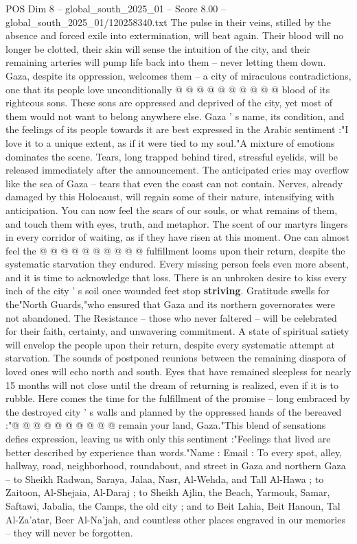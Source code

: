 \begin{textsample}{POS Dim 8 – global\_south\_2025\_01 – Score 8.00 – global\_south\_2025\_01/120258340.txt}
The pulse in their veins, stilled by the absence and forced exile into extermination, will beat again.
Their blood will no longer be clotted, their skin will sense the intuition of the city, and their remaining arteries will pump life back into them -- never letting them down.
Gaza, despite its oppression, welcomes them -- a city of miraculous contradictions, one that its people love unconditionally @ @ @ @ @ @ @ @ @ @ blood of its righteous sons.
These sons are oppressed and deprived of the city, yet most of them would not want to belong anywhere else.
Gaza ' s name, its condition, and the feelings of its people towards it are best expressed in the Arabic sentiment :"I love it to a unique extent, as if it were tied to my soul."A mixture of emotions dominates the scene.
Tears, long trapped behind tired, stressful eyelids, will be released immediately after the announcement.
The anticipated cries may overflow like the sea of Gaza -- tears that even the coast can not contain.
Nerves, already damaged by this Holocaust, will regain some of their nature, intensifying with anticipation.
You can now feel the scars of our souls, or what remains of them, and touch them with eyes, truth, and metaphor.
The scent of our martyrs lingers in every corridor of waiting, as if they have risen at this moment.
One can almost feel the @ @ @ @ @ @ @ @ @ @ fulfillment looms upon their return, despite the systematic starvation they endured.
Every missing person feels even more absent, and it is time to acknowledge that loss.
There is an unbroken desire to kiss every inch of the city ' s soil once wounded feet stop \textbf{striving}.
Gratitude swells for the"North Guards,"who ensured that Gaza and its northern governorates were not abandoned.
The Resistance -- those who never faltered -- will be celebrated for their faith, certainty, and unwavering commitment.
A state of spiritual satiety will envelop the people upon their return, despite every systematic attempt at starvation.
The sounds of postponed reunions between the remaining diaspora of loved ones will echo north and south.
Eyes that have remained sleepless for nearly 15 months will not close until the dream of returning is realized, even if it is to rubble.
Here comes the time for the fulfillment of the promise -- long embraced by the destroyed city ' s walls and planned by the oppressed hands of the bereaved :"@ @ @ @ @ @ @ @ @ @ remain your land, Gaza."This blend of sensations defies expression, leaving us with only this sentiment :"Feelings that lived are better described by experience than words."Name : Email : To every spot, alley, hallway, road, neighborhood, roundabout, and street in Gaza and northern Gaza -- to Sheikh Radwan, Saraya, Jalaa, Nasr, Al-Wehda, and Tall Al-Hawa ; to Zaitoon, Al-Shejaia, Al-Daraj ; to Sheikh Ajlin, the Beach, Yarmouk, Samar, Saftawi, Jabalia, the Camps, the old city ; and to Beit Lahia, Beit Hanoun, Tal Al-Za'atar, Beer Al-Na'jah, and countless other places engraved in our memories -- they will never be forgotten.

\end{textsample}
